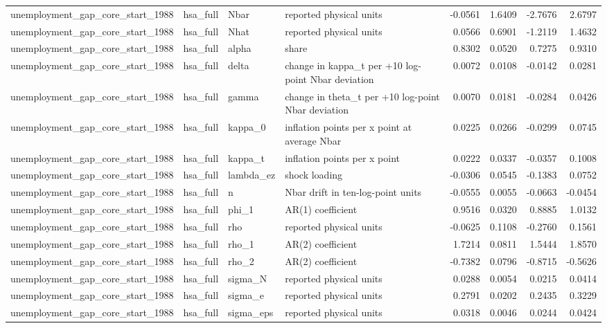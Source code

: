 \begin{tabular}{llllrrrr}
unemployment\_gap\_core\_start\_1988 & hsa\_full & Nbar & reported physical units & -0.0561 & 1.6409 & -2.7676 & 2.6797 \\
unemployment\_gap\_core\_start\_1988 & hsa\_full & Nhat & reported physical units & 0.0566 & 0.6901 & -1.2119 & 1.4632 \\
unemployment\_gap\_core\_start\_1988 & hsa\_full & alpha & share & 0.8302 & 0.0520 & 0.7275 & 0.9310 \\
unemployment\_gap\_core\_start\_1988 & hsa\_full & delta & change in kappa\_t per +10 log-point Nbar deviation & 0.0072 & 0.0108 & -0.0142 & 0.0281 \\
unemployment\_gap\_core\_start\_1988 & hsa\_full & gamma & change in theta\_t per +10 log-point Nbar deviation & 0.0070 & 0.0181 & -0.0284 & 0.0426 \\
unemployment\_gap\_core\_start\_1988 & hsa\_full & kappa\_0 & inflation points per x point at average Nbar & 0.0225 & 0.0266 & -0.0299 & 0.0745 \\
unemployment\_gap\_core\_start\_1988 & hsa\_full & kappa\_t & inflation points per x point & 0.0222 & 0.0337 & -0.0357 & 0.1008 \\
unemployment\_gap\_core\_start\_1988 & hsa\_full & lambda\_ez & shock loading & -0.0306 & 0.0545 & -0.1383 & 0.0752 \\
unemployment\_gap\_core\_start\_1988 & hsa\_full & n & Nbar drift in ten-log-point units & -0.0555 & 0.0055 & -0.0663 & -0.0454 \\
unemployment\_gap\_core\_start\_1988 & hsa\_full & phi\_1 & AR(1) coefficient & 0.9516 & 0.0320 & 0.8885 & 1.0132 \\
unemployment\_gap\_core\_start\_1988 & hsa\_full & rho & reported physical units & -0.0625 & 0.1108 & -0.2760 & 0.1561 \\
unemployment\_gap\_core\_start\_1988 & hsa\_full & rho\_1 & AR(2) coefficient & 1.7214 & 0.0811 & 1.5444 & 1.8570 \\
unemployment\_gap\_core\_start\_1988 & hsa\_full & rho\_2 & AR(2) coefficient & -0.7382 & 0.0796 & -0.8715 & -0.5626 \\
unemployment\_gap\_core\_start\_1988 & hsa\_full & sigma\_N & reported physical units & 0.0288 & 0.0054 & 0.0215 & 0.0414 \\
unemployment\_gap\_core\_start\_1988 & hsa\_full & sigma\_e & reported physical units & 0.2791 & 0.0202 & 0.2435 & 0.3229 \\
unemployment\_gap\_core\_start\_1988 & hsa\_full & sigma\_eps & reported physical units & 0.0318 & 0.0046 & 0.0244 & 0.0424 \\

\end{tabular}

